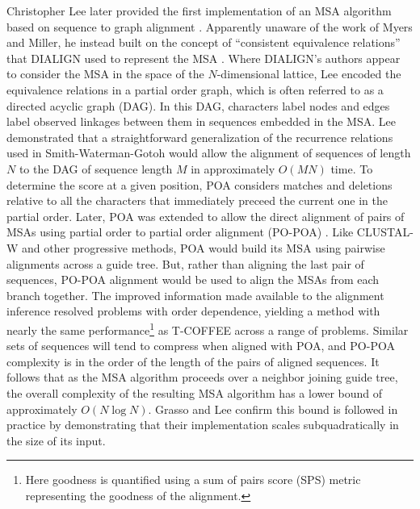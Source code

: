 Christopher Lee later provided the first implementation of an MSA algorithm based on sequence to graph alignment \cite{lee2002POA}.
Apparently unaware of the work of Myers and Miller, he instead built on the concept of ``consistent equivalence relations'' that DIALIGN used to represent the MSA \cite{morgenstern1996multiple}.
Where DIALIGN's authors appear to consider the MSA in the space of the $N$-dimensional lattice, Lee encoded the equivalence relations in a partial order graph, which is often referred to as a directed acyclic graph (DAG).
In this DAG, characters label nodes and edges label observed linkages between them in sequences embedded in the MSA.
Lee demonstrated that a straightforward generalization of the recurrence relations used in Smith-Waterman-Gotoh would allow the alignment of sequences of length $N$ to the DAG of sequence length $M$ in approximately $O(MN)$ time.
To determine the score at a given position, POA considers matches and deletions relative to all the characters that immediately preceed the current one in the partial order.
Later, POA was extended to allow the direct alignment of pairs of MSAs using partial order to partial order alignment (PO-POA) \cite{grasso2004combining}.
Like CLUSTAL-W and other progressive methods, POA would build its MSA using pairwise alignments across a guide tree.
But, rather than aligning the last pair of sequences, PO-POA alignment would be used to align the MSAs from each branch together.
The improved information made available to the alignment inference resolved problems with order dependence, yielding a method with nearly the same performance\footnote{Here goodness is quantified using a sum of pairs score (SPS) metric representing the goodness of the alignment.} as T-COFFEE across a range of problems.
Similar sets of sequences will tend to compress when aligned with POA, and PO-POA complexity is in the order of the length of the pairs of aligned sequences.
It follows that as the MSA algorithm proceeds over a neighbor joining guide tree, the overall complexity of the resulting MSA algorithm has a lower bound of approximately $O(N\log{N})$.
Grasso and Lee confirm this bound is followed in practice by demonstrating that their implementation scales subquadratically in the size of its input.

